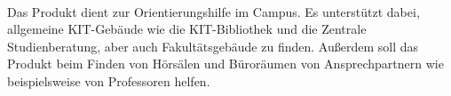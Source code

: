 \paragraph*{}
Das Produkt dient zur Orientierungshilfe im \Gls{Campus}.
Es unterstützt dabei, allgemeine \Gls{KIT}-Gebäude wie die \Gls{KIT}-Bibliothek und die Zentrale Studienberatung, aber auch Fakultätsgebäude zu finden. 
Außerdem soll das Produkt beim Finden von Hörsälen und Büroräumen von Ansprechpartnern wie beispielsweise von Professoren helfen.
